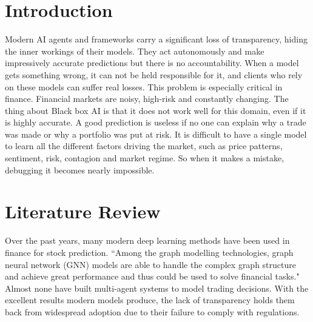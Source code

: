 \documentclass[conference]{IEEEtran}
\begin{document}
\section{Introduction}
 Modern AI agents and frameworks carry a significant loss of transparency, hiding the inner workings of their models. They act autonomously and make impressively accurate predictions but there is no accountability. When a model gets something wrong, it can not be held responsible for it, and clients who rely on these models can suffer real losses. This problem is especially critical in finance. Financial markets are noisy, high-risk and constantly changing. The thing about Black box AI is that it does not work well for this domain, even if it is highly accurate. A good prediction is useless if no one can explain why a trade was made or why a portfolio was put at risk. It is difficult to have a single model to learn all the different factors driving the market, such as price patterns, sentiment, risk, contagion and market regime. So when it makes a mistake, debugging it becomes nearly impossible. 



\section{Literature Review}
 
Over the past years, many modern deep learning methods have been used in finance for stock prediction. ``Among the graph modelling technologies, graph neural network (GNN) models are able to handle the complex graph structure and achieve great performance and thus could be used to solve financial tasks."\cite{financesurvey} Almost none have built multi-agent systems to model trading decisions. With the excellent results modern models produce, the lack of transparency holds them back from widespread adoption due to their failure to comply with regulations. 
\end{document}
